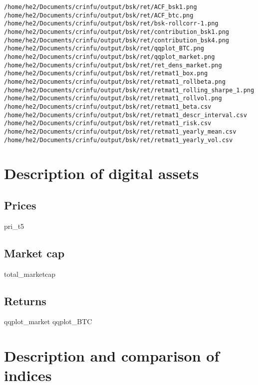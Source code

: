 \documentclass[12,]{article}
\begin{document}
\begin{verbatim}
/home/he2/Documents/crinfu/output/bsk/ret/ACF_bsk1.png
/home/he2/Documents/crinfu/output/bsk/ret/ACF_btc.png
/home/he2/Documents/crinfu/output/bsk/ret/bsk-rollcorr-1.png
/home/he2/Documents/crinfu/output/bsk/ret/contribution_bsk1.png
/home/he2/Documents/crinfu/output/bsk/ret/contribution_bsk4.png
/home/he2/Documents/crinfu/output/bsk/ret/qqplot_BTC.png
/home/he2/Documents/crinfu/output/bsk/ret/qqplot_market.png
/home/he2/Documents/crinfu/output/bsk/ret/ret_dens_market.png
/home/he2/Documents/crinfu/output/bsk/ret/retmat1_box.png
/home/he2/Documents/crinfu/output/bsk/ret/retmat1_rollbeta.png
/home/he2/Documents/crinfu/output/bsk/ret/retmat1_rolling_sharpe_1.png
/home/he2/Documents/crinfu/output/bsk/ret/retmat1_rollvol.png
/home/he2/Documents/crinfu/output/bsk/ret/retmat1_beta.csv
/home/he2/Documents/crinfu/output/bsk/ret/retmat1_descr_interval.csv
/home/he2/Documents/crinfu/output/bsk/ret/retmat1_risk.csv
/home/he2/Documents/crinfu/output/bsk/ret/retmat1_yearly_mean.csv
/home/he2/Documents/crinfu/output/bsk/ret/retmat1_yearly_vol.csv
\end{verbatim}

\section{Description of digital
assets}\label{description-of-digital-assets}

\subsection{Prices}\label{prices-1}

pri\_t5

\subsection{Market cap}\label{market-cap}

total\_marketcap

\subsection{Returns}\label{returns-1}

qqplot\_market qqplot\_BTC

\section{Description and comparison of
indices}\label{description-and-comparison-of-indices}
\end{document}
